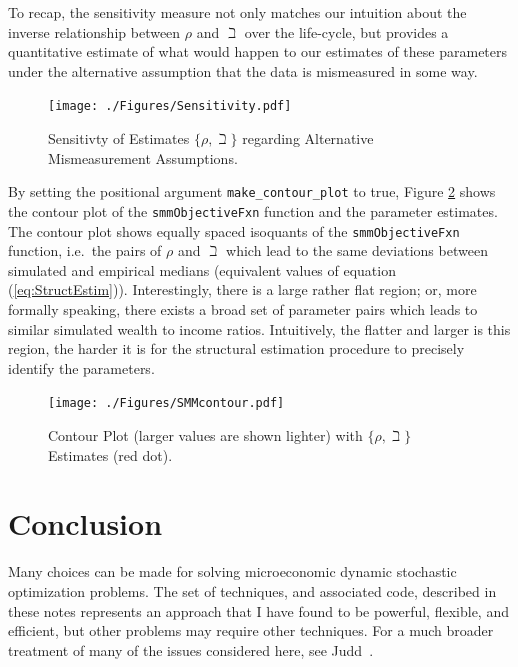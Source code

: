 \documentclass[titlepage, headings=optiontotocandhead]{econtex}
\begin{document}
To recap, the sensitivity measure not only matches our intuition about the inverse relationship between $\rho$ and $\beth$ over the life-cycle, but provides a quantitative estimate of what would happen to our estimates of these parameters under the alternative assumption that the data is mismeasured in some way.

\hypertarget{PlotSensitivityMeasure}{}
\begin{figure}
  \texttt{[image: ./Figures/Sensitivity.pdf]}
  \caption{Sensitivty of Estimates $\{\rho,\beth\}$ regarding Alternative Mismeasurement Assumptions.}
  \label{fig:PlotSensitivityMeasure}
\end{figure}

By setting the positional argument \texttt{make\_contour\_plot} to true, Figure \ref{fig:PlotContourMedianStrEst} shows the contour plot of the \texttt{smmObjectiveFxn} function and the parameter estimates. The contour plot shows equally spaced isoquants of the \texttt{smmObjectiveFxn} function, i.e.\ the pairs of $\rho$ and $\beth$ which lead to the same deviations between simulated and empirical medians (equivalent values of equation (\ref{eq:StructEstim})). Interestingly, there is a large rather flat region; or, more formally speaking, there exists a broad set of parameter pairs which leads to similar simulated wealth to income ratios. Intuitively, the flatter and larger is this region, the harder it is for the structural estimation procedure to precisely identify the parameters.


\hypertarget{PlotContourMedianStrEst}{}
\begin{figure}
  \texttt{[image: ./Figures/SMMcontour.pdf]}
  \caption{Contour Plot (larger values are shown lighter) with $\{\rho,\beth\}$ Estimates (red dot).}
  \label{fig:PlotContourMedianStrEst}
\end{figure}


\hypertarget{conclusion}{}
\section{Conclusion}

Many choices can be made for solving microeconomic dynamic stochastic optimization problems.  The set of techniques, and associated code, described in these notes represents an approach that I have found to be powerful, flexible, and efficient, but other problems may require other techniques.  For a much broader treatment of many of the issues considered here, see Judd~\citeyearpar{judd:book}.
\end{document}
